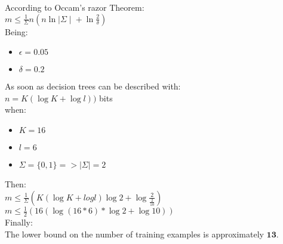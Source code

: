 According to Occam's razor Theorem:
\\
\bigbreak
$ m \leq \frac{1}{\Sigma} n (n\ln{\mid \Sigma \mid}+\ln{\frac{2}{\delta}})$
\\
\bigbreak
Being:
\begin{itemize}
	\item $\epsilon = 0.05$
	\item $\delta = 0.2$
\end{itemize}
As soon as decision trees can be described with:\\
$n = K(\log{K}+\log{l}))$ bits\\
\bigbreak
when:
\begin{itemize}
	\item $K = 16$
	\item $l = 6$
	\item $\Sigma = \{0,1\} => \mid \Sigma \mid = 2$
\end{itemize}
Then:\\
\bigbreak
	$m \leq \frac{1}{\Sigma} (K(\log{K}+log{l})\log{2}+\log{\frac{2}{\frac{2}{10}}})$\\
	\bigbreak
	$ m \leq \frac{1}{2}(16(\log{(16*6)}*\log{2}+\log{10})) $\\
	\bigbreak
Finally:\\
The lower bound on the number of training examples is approximately $\textbf{13}$. 
